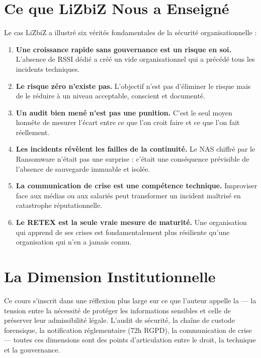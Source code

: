 \section*{Ce que LiZbiZ Nous a Enseigné}

\begin{boxresume}
Le cas LiZbiZ a illustré six vérités fondamentales de la sécurité organisationnelle :

\begin{enumerate}
    \item \textbf{Une croissance rapide sans gouvernance est un risque en soi.} L'absence de RSSI dédié a créé un vide organisationnel qui a précédé tous les incidents techniques.
    \item \textbf{Le risque zéro n'existe pas.} L'objectif n'est pas d'éliminer le risque mais de le réduire à un niveau acceptable, conscient et documenté.
    \item \textbf{Un audit bien mené n'est pas une punition.} C'est le seul moyen honnête de mesurer l'écart entre ce que l'on croit faire et ce que l'on fait réellement.
    \item \textbf{Les incidents révèlent les failles de la continuité.} Le NAS chiffré par le Ransomware n'était pas une surprise : c'était une conséquence prévisible de l'absence de sauvegarde immuable et isolée.
    \item \textbf{La communication de crise est une compétence technique.} Improviser face aux médias ou aux salariés peut transformer un incident maîtrisé en catastrophe réputationnelle.
    \item \textbf{Le RETEX est la seule vraie mesure de maturité.} Une organisation qui apprend de ses crises est fondamentalement plus résiliente qu'une organisation qui n'en a jamais connu.
\end{enumerate}
\end{boxresume}

\section*{La Dimension Institutionnelle}

Ce cours s'inscrit dans une réflexion plus large sur ce que l'auteur appelle la  — la tension entre la nécessité de protéger les informations sensibles et celle de préserver leur admissibilité légale. L'audit de sécurité, la chaîne de custode forensique, la notification réglementaire (72h RGPD), la communication de crise — toutes ces dimensions sont des points d'articulation entre le droit, la technique et la gouvernance.

